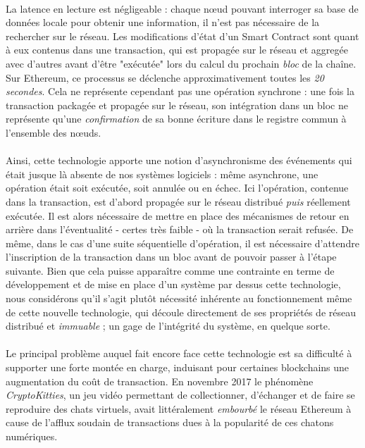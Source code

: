 \paragraph{} La latence en lecture est négligeable : chaque n\oe{}ud pouvant interroger sa base de données locale pour obtenir
une information, il n'est pas nécessaire de la rechercher sur le réseau. Les modifications d'état d'un Smart Contract sont
quant à eux contenus dans une transaction, qui est propagée sur le réseau et aggregée avec d'autres avant d'être "exécutée"
lors du calcul du prochain \emph{bloc} de la chaîne. Sur Ethereum, ce processus se déclenche approximativement toutes les
\emph{20 secondes}. Cela ne représente cependant pas une opération synchrone : une fois la transaction packagée et propagée
sur le réseau, son intégration dans un bloc ne représente qu'une \emph{confirmation} de sa bonne écriture dans le registre 
commun à l'ensemble des n\oe{}uds.

\paragraph{} Ainsi, cette technologie apporte une notion d'asynchronisme des événements qui était jusque là absente de nos
systèmes logiciels : même asynchrone, une opération était soit exécutée, soit annulée ou en échec. Ici l'opération, contenue 
dans la transaction, est d'abord propagée sur le réseau distribué \emph{puis} réellement exécutée. Il est alors nécessaire 
de mettre en place des mécanismes de retour en arrière dans l'éventualité - certes très faible - où la transaction serait refusée.
De même, dans le cas d'une suite séquentielle d'opération, il est nécessaire d'attendre l'inscription de la transaction dans 
un bloc avant de pouvoir passer à l'étape suivante. Bien que cela puisse apparaître comme une contrainte en terme de développement
et de mise en place d'un système par dessus cette technologie, nous considérons qu'il s'agit plutôt nécessité inhérente au 
fonctionnement même de cette nouvelle technologie, qui découle directement de ses propriétés de réseau distribué et \emph{immuable} ;
un gage de l'intégrité du système, en quelque sorte.

\paragraph{} Le principal problème auquel fait encore face cette technologie est sa difficulté à supporter une forte montée 
en charge, induisant pour certaines blockchains une augmentation du coût de transaction. En novembre 2017 le phénomène
\emph{CryptoKitties}, un jeu vidéo permettant de collectionner, d'échanger et de faire se reproduire des chats virtuels,
avait littéralement \emph{embourbé} le réseau Ethereum à cause de l'afflux soudain de transactions dues à la popularité
de ces chatons numériques.

